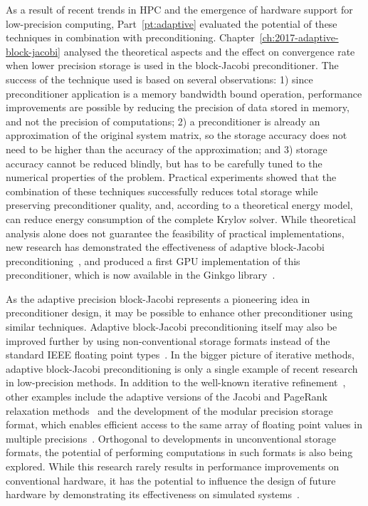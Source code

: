 As a result of recent trends in HPC and the emergence of hardware support for
low-precision computing, Part~\ref{pt:adaptive} evaluated the potential of these
techniques in combination with preconditioning.
Chapter~\ref{ch:2017-adaptive-block-jacobi} analysed the theoretical aspects and
the effect on convergence rate when lower precision storage is used in the
block-Jacobi preconditioner. The success of the technique used is based on
several observations: 1) since preconditioner application is a memory bandwidth
bound operation, performance improvements are possible by reducing the precision
of data stored in memory, and not the precision of computations; 2) a
preconditioner is already an approximation of the original system matrix, so the
storage accuracy does not need to be higher than the accuracy of the
approximation; and 3) storage accuracy cannot be reduced blindly, but has to be
carefully tuned to the numerical properties of the problem. Practical
experiments showed that the combination of these techniques successfully reduces
total storage while preserving preconditioner quality, and, according to a
theoretical energy model, can reduce energy consumption of the complete Krylov
solver. While theoretical analysis alone does not guarantee the feasibility of
practical implementations, new research has demonstrated the effectiveness of
adaptive block-Jacobi preconditioning~\cite{adaptive-jacobi-gpu}, and produced a
first GPU implementation of this preconditioner, which is now available in the
Ginkgo library~\cite{ginkgo}.

As the adaptive precision block-Jacobi represents a pioneering idea in
preconditioner design, it may be possible to enhance other preconditioner using
similar techniques. Adaptive block-Jacobi preconditioning itself may also be
improved further by using non-conventional storage formats instead of the
standard IEEE floating point types~\cite{adaptive-jacobi-gpu}. In the bigger
picture of iterative methods, adaptive block-Jacobi preconditioning is only a
single example of recent research in low-precision methods. In addition to the
well-known iterative refinement~\cite{higham-ir}, other examples include the
adaptive versions of the Jacobi and PageRank relaxation
methods~\cite{jacobi,jacobi-modular,pagerank} and the development of the modular
precision storage format, which enables efficient access to the same array of
floating point values in multiple
precisions~\cite{jacobi-modular,pagerank,anzt-ir}. Orthogonal to
developments in unconventional storage formats, the potential of performing
computations in such formats is also being explored. While this research rarely
results in performance improvements on conventional hardware, it has the
potential to influence the design of future hardware by demonstrating
its effectiveness on simulated systems~\cite{floatx, flexfloat}.

